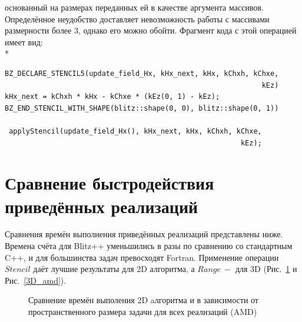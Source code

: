 \documentclass[10pt]{article}
\begin{document}
основанный на размерах переданных ей в качестве аргумента массивов. 
Определённое неудобство доставляет невозможность работы с массивами размерности
более 3, однако его можно обойти. Фрагмент кода с этой операцией имеет вид:\\*
\begin{verbatim}
BZ_DECLARE_STENCIL5(update_field_Hx, kHx_next, kHx, kChxh, kChxe,
                                                             kEz)
kHx_next = kChxh * kHx - kChxe * (kEz(0, 1) - kEz);
BZ_END_STENCIL_WITH_SHAPE(blitz::shape(0, 0), blitz::shape(0, 1))
 
 applyStencil(update_field_Hx(), kHx_next, kHx, kChxh, kChxe,
                                                        kEz);
\end{verbatim}
\newpage
\section{Сравнение быстродействия приведённых реализаций}
Сравнения времён выполнения приведённых реализаций представлены ниже.
Времена счёта для Blitz++ уменьшились в разы по сравнению со стандартным C++,
и для большинства задач превосходят Fortran. Применение операции $Stencil$
даёт лучшие результаты для 2D алгоритма, а $Range~-$
для 3D (Рис.~\ref{2D_amd} и Рис.~\ref{3D_amd}).
\renewcommand{\figurename}{Рис.}
\begin{figure}[h]
\begin{minipage}[h]{0.99\textwidth}
\end{minipage}
\caption{Сравнение времён выполения 2D aлгоритма и в зависимости 
  от пространственного размера задачи для всех реализаций (AMD)}
\label{2D_amd}
\end{figure}
\end{document}
